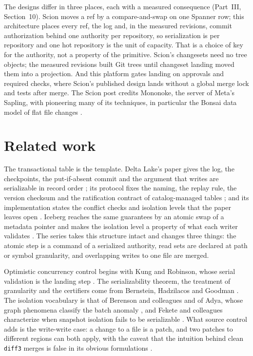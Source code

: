 \documentclass[11pt,letterpaper]{article}
\theoremstyle{definition}
\theoremstyle{remark}
\begin{document}
The designs differ in three places, each with a measured consequence (Part~III, Section~10). Scion moves a ref by a compare-and-swap on one Spanner row; this architecture places every ref, the log and, in the measured revisions, commit authorization behind one authority per repository, so serialization is per repository and one hot repository is the unit of capacity. That is a choice of key for the authority, not a property of the primitive. Scion's changesets need no tree objects; the measured revisions built Git trees until changeset landing moved them into a projection. And this platform gates landing on approvals and required checks, where Scion's published design lands without a global merge lock and tests after merge. The Scion post credits Mononoke, the server of Meta's Sapling, with pioneering many of its techniques, in particular the Bonsai data model of flat file changes \cite{anthropic2026scion,mononokebonsai}.

\section{Related work}
\label{sec:syn:related}

The transactional table is the template. Delta Lake's paper gives the log, the checkpoints, the put-if-absent commit and the argument that writes are serializable in record order \cite{armbrust2020delta}; its protocol fixes the naming, the replay rule, the version checksum and the ratification contract of catalog-managed tables \cite{deltaprotocol}; and its implementation states the conflict checks and isolation levels that the paper leaves open \cite{deltaconflictsrc,deltaisolationsrc,deltadocscc}. Iceberg reaches the same guarantees by an atomic swap of a metadata pointer and makes the isolation level a property of what each writer validates \cite{icebergspec}. The series takes this structure intact and changes three things: the atomic step is a command of a serialized authority, read sets are declared at path or symbol granularity, and overlapping writes to one file are merged.

Optimistic concurrency control begins with Kung and Robinson, whose serial validation is the landing step \cite{kung1981occ}. The serializability theorem, the treatment of granularity and the certifiers come from Bernstein, Hadzilacos and Goodman \cite{bhg1987}. The isolation vocabulary is that of Berenson and colleagues \cite{berenson1995critique} and of Adya, whose graph phenomena classify the batch anomaly \cite{adya1999thesis}, and Fekete and colleagues characterize when snapshot isolation fails to be serializable \cite{fekete2005serializable}. What source control adds is the write-write case: a change to a file is a patch, and two patches to different regions can both apply, with the caveat that the intuition behind clean \texttt{diff3} merges is false in its obvious formulations \cite{khanna2007diff3}.
\end{document}
